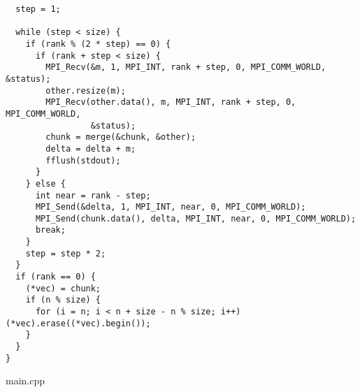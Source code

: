 \documentclass{report}
\begin{document}
\begin{lstlisting}
  step = 1;

  while (step < size) {
    if (rank % (2 * step) == 0) {
      if (rank + step < size) {
        MPI_Recv(&m, 1, MPI_INT, rank + step, 0, MPI_COMM_WORLD, &status);
        other.resize(m);
        MPI_Recv(other.data(), m, MPI_INT, rank + step, 0, MPI_COMM_WORLD,
                 &status);
        chunk = merge(&chunk, &other);
        delta = delta + m;
        fflush(stdout);
      }
    } else {
      int near = rank - step;
      MPI_Send(&delta, 1, MPI_INT, near, 0, MPI_COMM_WORLD);
      MPI_Send(chunk.data(), delta, MPI_INT, near, 0, MPI_COMM_WORLD);
      break;
    }
    step = step * 2;
  }
  if (rank == 0) {
    (*vec) = chunk;
    if (n % size) {
      for (i = n; i < n + size - n % size; i++) (*vec).erase((*vec).begin());
    }
  }
}
\end{lstlisting}
main.cpp
\end{document}
